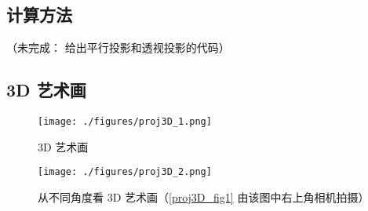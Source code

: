 \subsection{计算方法}
（未完成： 给出平行投影和透视投影的代码）

\subsection{3D 艺术画}
\begin{figure}[ht]
\centering
\texttt{[image: ./figures/proj3D\_1.png]}
\caption{3D 艺术画} \label{proj3D_fig1}
\end{figure}

\begin{figure}[ht]
\centering
\texttt{[image: ./figures/proj3D\_2.png]}
\caption{从不同角度看 3D 艺术画（\autoref{proj3D_fig1} 由该图中右上角相机拍摄）} \label{proj3D_fig2}
\end{figure}

